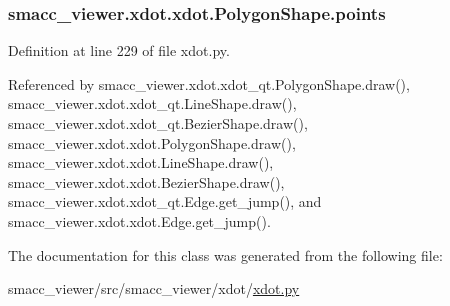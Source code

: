 \subsubsection[{\texorpdfstring{points}{points}}]{\setlength{\rightskip}{0pt plus 5cm}smacc\+\_\+viewer.\+xdot.\+xdot.\+Polygon\+Shape.\+points}\hypertarget{classsmacc__viewer_1_1xdot_1_1xdot_1_1PolygonShape_a07211b47e692cdcc89d412db44fec2a7}{}\label{classsmacc__viewer_1_1xdot_1_1xdot_1_1PolygonShape_a07211b47e692cdcc89d412db44fec2a7}


Definition at line 229 of file xdot.\+py.



Referenced by smacc\+\_\+viewer.\+xdot.\+xdot\+\_\+qt.\+Polygon\+Shape.\+draw(), smacc\+\_\+viewer.\+xdot.\+xdot\+\_\+qt.\+Line\+Shape.\+draw(), smacc\+\_\+viewer.\+xdot.\+xdot\+\_\+qt.\+Bezier\+Shape.\+draw(), smacc\+\_\+viewer.\+xdot.\+xdot.\+Polygon\+Shape.\+draw(), smacc\+\_\+viewer.\+xdot.\+xdot.\+Line\+Shape.\+draw(), smacc\+\_\+viewer.\+xdot.\+xdot.\+Bezier\+Shape.\+draw(), smacc\+\_\+viewer.\+xdot.\+xdot\+\_\+qt.\+Edge.\+get\+\_\+jump(), and smacc\+\_\+viewer.\+xdot.\+xdot.\+Edge.\+get\+\_\+jump().



The documentation for this class was generated from the following file\+:\begin{DoxyCompactItemize}
\item 
smacc\+\_\+viewer/src/smacc\+\_\+viewer/xdot/\hyperlink{xdot_8py}{xdot.\+py}\end{DoxyCompactItemize}
